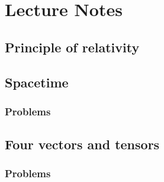 %
%
%
%
%
\part{Lecture Notes}
   \chapter{Principle of relativity}
      
      

   \chapter{Spacetime}
      
      
      
      
      \section{Problems}
         
         

   \chapter{Four vectors and tensors}
      
      
      \section{Problems}
         
         
         
         
         
         
         
         
         
         
         
         

